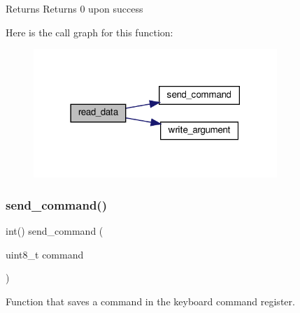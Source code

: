 \begin{DoxyReturn}{Returns}
Returns 0 upon success 
\end{DoxyReturn}
Here is the call graph for this function\+:
\nopagebreak
\begin{figure}[H]
\begin{center}
\leavevmode
\includegraphics[width=261pt]{group__mouse_gad25b8bf71166026dbf192c6d013d54d6_cgraph}
\end{center}
\end{figure}
\mbox{\label{group__mouse_ga926121b9c6d89ac8825f115e3eb8dac3}} 
\subsubsection{\texorpdfstring{send\+\_\+command()}{send\_command()}}
{\footnotesize\ttfamily int() send\+\_\+command (\begin{DoxyParamCaption}\item[{uint8\+\_\+t}]{command }\end{DoxyParamCaption})}



Function that saves a command in the keyboard command register. 


